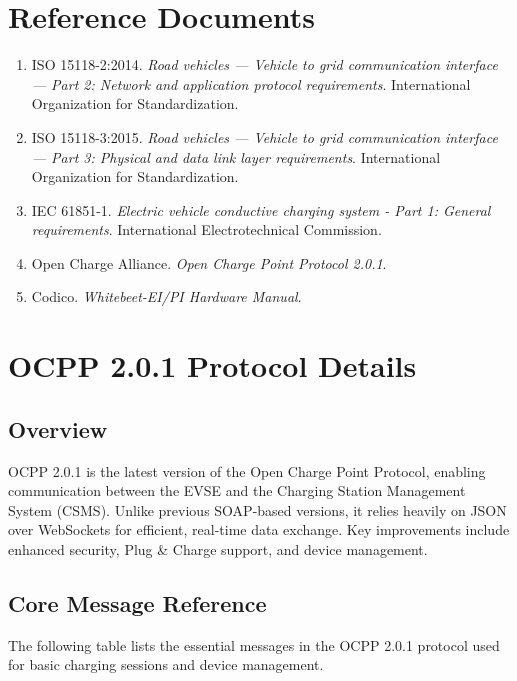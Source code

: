 \documentclass[a4paper,11pt]{report}
\begin{document}
\chapter{Reference Documents}
\begin{enumerate}
    \item[{[1]}] ISO 15118-2:2014. \textit{Road vehicles — Vehicle to grid communication interface — Part 2: Network and application protocol requirements}. International Organization for Standardization.
    \item[{[2]}] ISO 15118-3:2015. \textit{Road vehicles — Vehicle to grid communication interface — Part 3: Physical and data link layer requirements}. International Organization for Standardization.
    \item[{[3]}] IEC 61851-1. \textit{Electric vehicle conductive charging system - Part 1: General requirements}. International Electrotechnical Commission.
    \item[{[4]}] Open Charge Alliance. \textit{Open Charge Point Protocol 2.0.1}.
    \item[{[5]}] Codico. \textit{Whitebeet-EI/PI Hardware Manual}.
\end{enumerate}

\appendix
\chapter{OCPP 2.0.1 Protocol Details}
\section{Overview}
OCPP 2.0.1 is the latest version of the Open Charge Point Protocol, enabling communication between the EVSE and the Charging Station Management System (CSMS). Unlike previous SOAP-based versions, it relies heavily on JSON over WebSockets for efficient, real-time data exchange. Key improvements include enhanced security, Plug \& Charge support, and device management.

\section{Core Message Reference}
The following table lists the essential messages in the OCPP 2.0.1 protocol used for basic charging sessions and device management.
\end{document}
